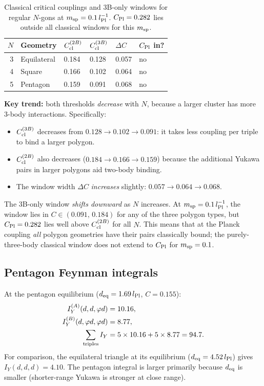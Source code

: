 \begin{table}[h]
\centering
\caption{Classical critical couplings and 3B-only windows for regular
$N$-gons at $m_{\rm sp}=0.1\,l_{\rm Pl}^{-1}$.
$C_{\rm Pl}=0.282$ lies outside all classical windows for this $m_{\rm sp}$.}
\label{tab:polygon_windows}
\begin{tabular}{rlllll}
\hline
$N$ & Geometry & $C_{\rm cl}^{(2B)}$ & $C_{\rm cl}^{(3B)}$ & $\Delta C$ &
$C_{\rm Pl}$ in? \\
\hline
3 & Equilateral & 0.184 & 0.128 & 0.057 & no \\
4 & Square      & 0.166 & 0.102 & 0.064 & no \\
5 & Pentagon    & 0.159 & 0.091 & 0.068 & no \\
\hline
\end{tabular}
\end{table}

\noindent
\textbf{Key trend:} both thresholds \emph{decrease} with $N$, because
a larger cluster has more 3-body interactions.  Specifically:
\begin{itemize}
\item $C_{\rm cl}^{(3B)}$ decreases from $0.128\to0.102\to0.091$:
  it takes less coupling per triple to bind a larger polygon.
\item $C_{\rm cl}^{(2B)}$ also decreases ($0.184\to0.166\to0.159$)
  because the additional Yukawa pairs in larger polygons aid two-body
  binding.
\item The window width $\Delta C$ \emph{increases} slightly:
  $0.057\to0.064\to0.068$.
\end{itemize}

The 3B-only window \emph{shifts downward} as $N$ increases.
At $m_{\rm sp}=0.1\,l_{\rm Pl}^{-1}$, the window lies in
$C\in(0.091,\,0.184)$ for any of the three polygon types,
but $C_{\rm Pl}=0.282$ lies well above $C_{\rm cl}^{(2B)}$ for all $N$.
This means that at the Planck coupling \emph{all} polygon geometries
have their pairs classically bound; the purely-three-body classical window
does not extend to $C_{\rm Pl}$ for $m_{\rm sp}=0.1$.

\subsection{Pentagon Feynman integrals}

At the pentagon equilibrium ($d_{\rm eq}=1.69\,l_{\rm Pl}$, $C=0.155$):
\begin{align}
  I_Y^{(A)}(d,d,\varphi d) &= 10.16, \\
  I_Y^{(B)}(d,\varphi d,\varphi d) &= 8.77, \\
  \sum_{\rm triples} I_Y &= 5\times10.16 + 5\times8.77 = 94.7.
\end{align}
For comparison, the equilateral triangle at its equilibrium
($d_{\rm eq}=4.52\,l_{\rm Pl}$) gives $I_Y(d,d,d)=4.10$.
The pentagon integral is larger primarily because $d_{\rm eq}$ is smaller
(shorter-range Yukawa is stronger at close range).

